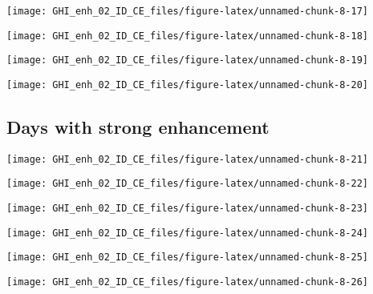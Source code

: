 \documentclass[
  10pt,
  a4paper,oneside]{article}
\begin{document}
\begin{center}\texttt{[image: GHI\_enh\_02\_ID\_CE\_files/figure-latex/unnamed-chunk-8-17]} \end{center}

\begin{center}\texttt{[image: GHI\_enh\_02\_ID\_CE\_files/figure-latex/unnamed-chunk-8-18]} \end{center}

\begin{center}\texttt{[image: GHI\_enh\_02\_ID\_CE\_files/figure-latex/unnamed-chunk-8-19]} \end{center}

\begin{center}\texttt{[image: GHI\_enh\_02\_ID\_CE\_files/figure-latex/unnamed-chunk-8-20]} \end{center}

\FloatBarrier

\hypertarget{days-with-strong-enhancement}{%
\subsection{Days with strong enhancement}\label{days-with-strong-enhancement}}

\begin{center}\texttt{[image: GHI\_enh\_02\_ID\_CE\_files/figure-latex/unnamed-chunk-8-21]} \end{center}

\begin{center}\texttt{[image: GHI\_enh\_02\_ID\_CE\_files/figure-latex/unnamed-chunk-8-22]} \end{center}

\begin{center}\texttt{[image: GHI\_enh\_02\_ID\_CE\_files/figure-latex/unnamed-chunk-8-23]} \end{center}

\begin{center}\texttt{[image: GHI\_enh\_02\_ID\_CE\_files/figure-latex/unnamed-chunk-8-24]} \end{center}

\begin{center}\texttt{[image: GHI\_enh\_02\_ID\_CE\_files/figure-latex/unnamed-chunk-8-25]} \end{center}

\begin{center}\texttt{[image: GHI\_enh\_02\_ID\_CE\_files/figure-latex/unnamed-chunk-8-26]} \end{center}
\end{document}
